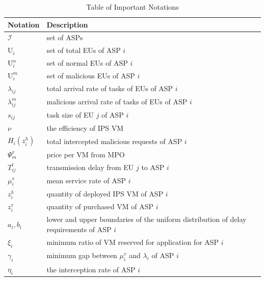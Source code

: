 \documentclass[10pt,journal, compsoc]{IEEEtran}
\begin{document}
\begin{table}[!t]
\centering
\caption{Table of Important Notations}
\label{notationlist}
\footnotesize
\begin{tabular}{|p{} |p{}|} \hline
 Notation & Description \\ \hline
 $\mathcal{I}$ & set of ASPs \\ \hline
 $\mathrm{U}_i$ & set of total EUs of ASP $i$ \\ \hline
 $\mathrm{U}_i^n$ & set of normal EUs of ASP $i$ \\ \hline
 $\mathrm{U}_i^m$ & set of malicious EUs of ASP $i$ \\ \hline
 $\lambda_{ij}$ & total arrival rate of tasks of EUs of ASP $i$ \\ \hline $\lambda_{ij}^m$ & malicious arrival rate of tasks of EUs of ASP $i$ \\ \hline
 $s_{ij}$ & task size of EU $j$ of ASP $i$ \\ \hline
 $\nu$ & the efficiency of IPS VM \\ \hline
$H_i(z_i^h)$ & total intercepted malicious requests of ASP $i$ \\ \hline
$\Psi_m^v$ & price per VM from MPO \\ \hline
 $T_{ij}^t$ & transmission delay from EU $j$ to ASP $i$ \\ \hline
 $\mu_i^v$ & mean service rate of ASP $i$ \\ \hline
 $z_i^h$ & quantity of deployed IPS VM of ASP $i$ \\ \hline
 $z_i^v$ & quantity of purchased VM of ASP $i$ \\ \hline
 $a_i, b_i$ & lower and upper boundaries of the uniform distribution of delay requirements of ASP $i$ \\ \hline
 $\xi_i$ & minimum ratio of VM reserved for application for ASP $i$  \\ \hline
 $\gamma_i$ & minimum gap between $\mu_i^v$ and $\lambda_i$ of ASP $i$ \\ \hline
 $\eta_i$ & the interception rate of ASP $i$ \\ \hline
\end{tabular}
\end{table}
\end{document}
